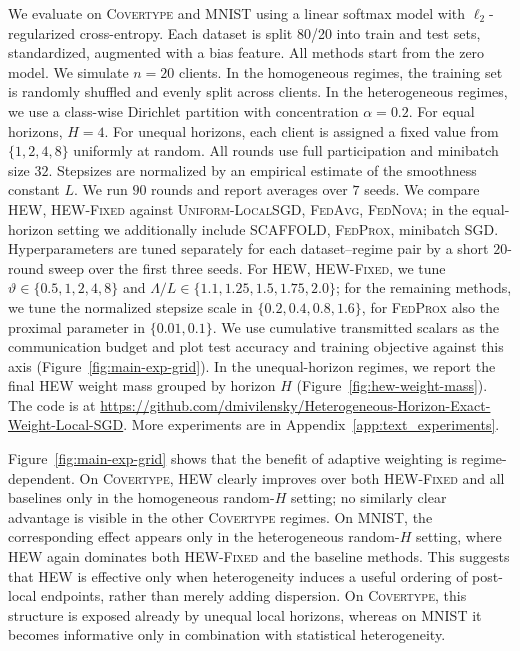 \documentclass{article}
\theoremstyle{definition}
\begin{document}
We evaluate on \textsc{Covertype} \cite{dua2017covertype} and \textsc{MNIST} \cite{lecun2010mnist} using a linear softmax model with $\ell_2$-regularized cross-entropy. Each dataset is split 80/20 into train and test sets, standardized, augmented with a bias feature. All methods start from the zero model. We simulate $n=20$ clients. In the homogeneous regimes, the training set is randomly shuffled and evenly split across clients. In the heterogeneous regimes, we use a class-wise Dirichlet partition with concentration $\alpha=0.2$. For equal horizons, $H=4$. For unequal horizons, each client is assigned a fixed value from $\{1,2,4,8\}$ uniformly at random. All rounds use full participation and minibatch size $32$. Stepsizes are normalized by an empirical estimate of the smoothness constant $L$. We run $90$ rounds and report averages over $7$ seeds. We compare \textsc{HEW}, \textsc{HEW-Fixed} against \textsc{Uniform-LocalSGD}, \textsc{FedAvg}, \textsc{FedNova}; in the equal-horizon setting we additionally include \textsc{SCAFFOLD}, \textsc{FedProx}, minibatch SGD. Hyperparameters are tuned separately for each dataset--regime pair by a short $20$-round sweep over the first three seeds. For \textsc{HEW}, \textsc{HEW-Fixed}, we tune $\vartheta \in \{0.5,1,2,4,8\}$ and $\Lambda/L \in \{1.1,1.25,1.5,1.75,2.0\}$; for the remaining methods, we tune the normalized stepsize scale in $\{0.2,0.4,0.8,1.6\}$, for \textsc{FedProx} also the proximal parameter in $\{0.01,0.1\}$. We use cumulative transmitted scalars as the communication budget and plot test accuracy and training objective against this axis (Figure~\ref{fig:main-exp-grid}). In the unequal-horizon regimes, we report the final \textsc{HEW} weight mass grouped by horizon $H$ (Figure~\ref{fig:hew-weight-mass}). 
The code is at \url{https://github.com/dmivilensky/Heterogeneous-Horizon-Exact-Weight-Local-SGD}. More experiments are in Appendix~\ref{app:text_experiments}.

Figure~\ref{fig:main-exp-grid} shows that the benefit of adaptive weighting is regime-dependent. On \textsc{Covertype}, HEW clearly improves over both \textsc{HEW-Fixed} and all baselines only in the homogeneous random-$H$ setting; no similarly clear advantage is visible in the other \textsc{Covertype} regimes. On \textsc{MNIST}, the corresponding effect appears only in the heterogeneous random-$H$ setting, where HEW again dominates both \textsc{HEW-Fixed} and the baseline methods. This suggests that HEW is effective only when heterogeneity induces a useful ordering of post-local endpoints, rather than merely adding dispersion. On \textsc{Covertype}, this structure is exposed already by unequal local horizons, whereas on \textsc{MNIST} it becomes informative only in combination with statistical heterogeneity.
\newline
\end{document}
